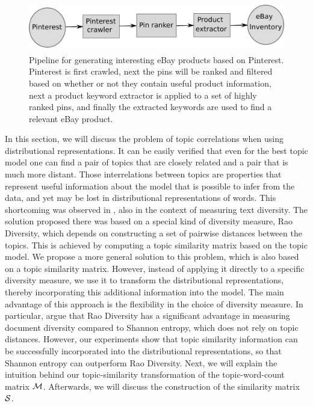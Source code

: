 \begin{figure}
\centering
\includegraphics[height=2.2cm]{figures/pinterest-pipeline.png}
\caption{Pipeline for generating interesting eBay products based on Pinterest. Pinterest is first crawled, next the pins will be ranked and filtered based on whether or not they contain useful product information, next a product keyword extractor is applied to a set of highly ranked pins, and finally the extracted keywords are used to find a relevant eBay product.}
\label{fig:pinterest-pipeline}
\end{figure}

In this section, we will discuss the problem of topic
correlations when using distributional representations. It can be easily verified 
that even for the best topic model one can find a
pair of topics that are closely related and a pair that is much more
distant. Those interrelations between topics are 
properties that represent useful information about the model that is
possible to infer from the data, and yet
may be lost in distributional representations of words. 
This shortcoming was observed in \cite{bache:2013},
also in the context of measuring text diversity. The solution proposed
there was based on a special kind of diversity measure, Rao Diversity,
which depends on constructing a set of pairwise distances between the
topics. This is achieved by computing a topic similarity matrix based on
the topic model. We propose a more general solution to this problem,
which is also based on a topic similarity matrix. However, instead of
applying it directly to a specific diversity measure, we use it to
transform the distributional representations, thereby incorporating this
additional information into the model. The main advantage of this
approach is the flexibility in the choice of diversity measure. In
particular, \cite{bache:2013} argue that Rao Diversity has a
significant advantage in measuring document diversity compared to
Shannon entropy, which does not rely on topic distances. However, our
experiments show that topic similarity information can be successfully
incorporated into the distributional representations, so that Shannon
entropy can outperform Rao Diversity.  Next, we will explain the
intuition behind our topic-similarity transformation of the
topic-word-count matrix ${\mathcal M}$. Afterwards, we will discuss the
construction of the similarity matrix ${\mathcal S}$.

